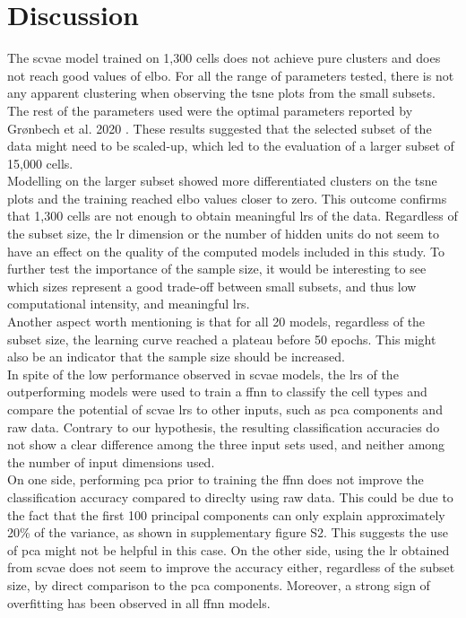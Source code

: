 \documentclass{article}
\begin{document}
\section{Discussion}
\label{sec:discussion}

\noindent The \gls{scvae} model trained on 1,300 cells does not achieve pure clusters and does not reach good values of \gls{elbo}. 
For all the range of parameters tested, there is not any apparent clustering when observing the \gls{tsne} plots from the small subsets. 
The rest of the parameters used were the optimal parameters reported by Grønbech et al. 2020 \cite{gronbech2020}.
These results suggested that the selected subset of the data might need to be scaled-up, which led to the evaluation of a larger subset of 15,000 cells.\\

\noindent Modelling on the larger subset showed more differentiated clusters on the \gls{tsne} plots and the training reached \gls{elbo} values closer to zero.  
This outcome confirms that  1,300  cells  are  not  enough to obtain meaningful \glspl{lr} of the data.
Regardless of the subset size, the \gls{lr} dimension or the number of hidden units do not seem to have an effect on the quality of the computed models included in this study.
To further test the importance of the sample size, it would be interesting to see which sizes represent a good trade-off between small subsets, and thus low computational intensity, and meaningful \glspl{lr}. \\

\noindent Another aspect worth mentioning is that for all 20 models, regardless of the subset size, the learning curve reached a plateau before 50 epochs. 
This might also be an indicator that the sample size should be increased.\\

\noindent In spite of the low performance observed in \gls{scvae} models, the \glspl{lr} of the outperforming models were used to train a \gls{ffnn} to classify the cell types and compare the potential of \gls{scvae} \glspl{lr} to other inputs, such as \gls{pca} components and raw data.
Contrary to our hypothesis, the resulting classification accuracies do not show a clear difference among the three input sets used, and neither among the number of input dimensions used. \\

\noindent On one side, performing \gls{pca} prior to training the \gls{ffnn} does not improve the classification accuracy compared to direclty using raw data.
This could be due to the fact that the first 100 principal components can only explain approximately 20\% of the variance, as shown in supplementary figure S2.
This suggests the use of \gls{pca} might not be helpful in this case.
On the other side, using the \gls{lr} obtained from \gls{scvae} does not seem to improve the accuracy either, regardless of the subset size, by direct comparison to the \gls{pca} components. 
Moreover, a strong sign of overfitting has been observed in all \gls{ffnn} models. \\ 
\end{document}
